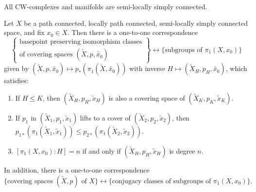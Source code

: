 \begin{remark}
  All CW-complexes and manifolds are semi-locally
  simply connected.
\end{remark}

\begin{theorem}
  Let $X$ be a path connected, locally path connected,
  semi-locally simply connected space, and fix $x_0 \in X$.
  Then there is a one-to-one correspondence
  \[
  \left\{\substack{\displaystyle\text{basepoint preserving isomorphism classes} \\ \displaystyle\text{of covering spaces $(\widetilde{X}, p, \widetilde{x_0})$}}\right\}
    \longleftrightarrow
    \{\text{subgroups of $\pi_1(X, x_0)$}\}
  \]
  given by $(\widetilde{X}, p, \widetilde{x_0}) \mapsto p_*(\pi_1(\widetilde{X}, \widetilde{x_0}))$
  with inverse $H \mapsto (\widetilde{X}_H, p_H, \widetilde{x_0})$, which
  satisfies:
  \begin{enumerate}
    \item If $H \le K$, then $(\widetilde{X}_H, p_H, \widetilde{x}_H)$ is also
      a covering space of $(\widetilde{X}_K, p_K, \widetilde{x}_K)$.
    \item If $p_1$ in $(\widetilde{X}_1, p_1, \widetilde{x}_1)$
      lifts to a cover of $(\widetilde{X}_2, p_2, \widetilde{x}_2)$,
      then $p_{1 *}(\pi_1(\widetilde{X}_1, \widetilde{x}_1)) \le p_{2 *}(\pi_1(\widetilde{X}_2, \widetilde{x}_2))$.
    \item
      $[\pi_1(X, x_0) : H] = n$ if and only if
      $(\widetilde{X}_H, p_H, \widetilde{x}_H)$ is degree $n$.
  \end{enumerate}
  In addition, there is a one-to-one correspondence
  \[
    \{\text{covering spaces $(\widetilde{X}, p)$ of $X$}\}
    \longleftrightarrow \{\text{conjugacy classes of subgroups of $\pi_1(X, x_0)$}\}.
  \]
\end{theorem}

